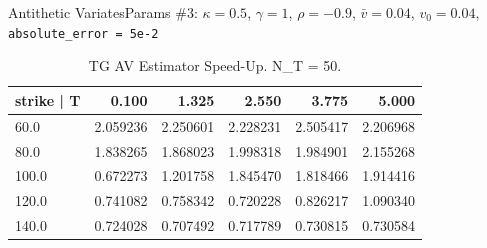     \begin{frame}{Antithetic Variates}{Params \#3: $\kappa = 0.5$, $\gamma = 1$, $\rho = -0.9$, $\bar v = 0.04$, $v_0 = 0.04$, \texttt{absolute\_error = 5e-2}}
        \begin{table}
            \begin{tabular}{lrrrrr}
                \toprule
                strike | T &     0.100 &     1.325 &     2.550 &     3.775 &     5.000 \\
                \midrule
                60.0   &  2.059236 &  2.250601 &  2.228231 &  2.505417 &  2.206968 \\
                80.0   &  1.838265 &  1.868023 &  1.998318 &  1.984901 &  2.155268 \\
                100.0  &  0.672273 &  1.201758 &  1.845470 &  1.818466 &  1.914416 \\
                120.0  &  0.741082 &  0.758342 &  0.720228 &  0.826217 &  1.090340 \\
                140.0  &  0.724028 &  0.707492 &  0.717789 &  0.730815 &  0.730584 \\
                \bottomrule
                \end{tabular}
            \caption{TG AV Estimator Speed-Up. N\_T = 50.}
        \end{table}         
    \end{frame}